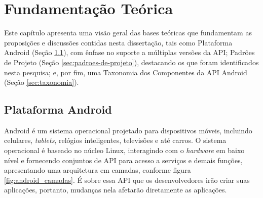 \chapter{Fundamentação Teórica} \label{ch:fundamentacao-teorica}

Este capítulo apresenta uma visão geral das bases teóricas que fundamentam as
proposições  e  discussões  contidas  nesta  dissertação,  tais  como  Plataforma
Android (Seção \ref{sec:plataforma-android}), com ênfase no suporte a múltiplas
versões da API; Padrões de Projeto (Seção \ref{sec:padroes-de-projeto}), 
destacando os que foram identificados nesta pesquisa;  e,
por fim, uma Taxonomia dos Componentes da API Android (Seção \ref{sec:taxonomia}). 

\section{Plataforma Android} \label{sec:plataforma-android}

Android é um sistema operacional projetado para dispositivos móveis, incluindo
celulares, \textit{tablets}, relógios inteligentes, televisões e até carros.
O sistema operacional é baseado no núcleo Linux, interagindo com o \textit{hardware}
em baixo nível e fornecendo conjuntos de API para acesso a serviços e demais
funções\cite{Lecheta2015}, apresentando uma arquitetura em camadas, conforme
figura \ref{fig:android_camadas}. É sobre essa API que os desenvolvedores irão
criar suas aplicações, portanto, mudanças nela afetarão diretamente as aplicações.

